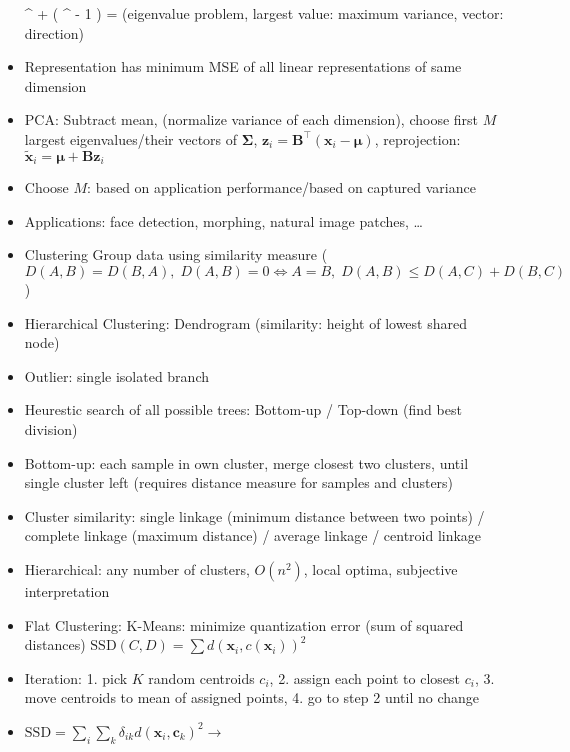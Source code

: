 \documentclass[11pt]{scrartcl}
\begin{document}
\begin{itemize}
        ^\top \bm{\Sigma}  + \lambda ( ^\top {} - 1 ) \Rightarrow 
         = \lambda {} \) (eigenvalue problem, largest value: maximum variance, 
        vector: direction)
    \item Representation has minimum MSE of all linear representations of same dimension
    \item PCA: Subtract mean, (normalize variance of each dimension), choose first \( M \) 
        largest eigenvalues/their vectors of \( \bm{\Sigma} \), \( \bm{z}_i = 
        \bm{B}^\top ( \bm{x}_i - \bm{\mu} ) \), reprojection: \( \tilde{\bm{x}}_i = 
        \bm{\mu} + \bm{B z}_i \)
    \item Choose \( M \): based on application performance/based on captured variance
    \item Applications: face detection, morphing, natural image patches, \dots
    \item Clustering Group data using similarity measure (\(D ( A, B ) = D ( B, A ), \; 
        D ( A, B ) = 0 \Leftrightarrow A = B, \; D ( A, B ) \leq D ( A, C ) + D ( B, C ) \))
    \item Hierarchical Clustering: Dendrogram (similarity: height of lowest shared node)
    \item Outlier: single isolated branch
    \item Heurestic search of all possible trees: Bottom-up / Top-down (find best division)
    \item Bottom-up: each sample in own cluster, merge closest two clusters, until single 
        cluster left (requires distance measure for samples and clusters)
    \item Cluster similarity: single linkage (minimum distance between two points) / complete 
        linkage (maximum distance) / average linkage / centroid linkage
    \item Hierarchical: any number of clusters, \( O ( n^2 ) \), local optima, subjective 
        interpretation
    \item Flat Clustering: K-Means: minimize quantization error (sum of squared distances) 
        \( \mathrm{SSD} ( C, D ) = \sum d ( \bm{x}_i, c ( \bm{x}_i ) )^2 \)
    \item Iteration: 1. pick \( K \) random centroids \( c_i \), 2. assign each point to 
        closest \( c_i \), 3. move centroids to mean of assigned points, 4. go to step 2 until 
        no change
    \item \( \mathrm{SSD} = \sum_i \sum_k \delta_{ik} d ( \bm{x}_i, \bm{c}_k )^2 \rightarrow \) 

\end{itemize}
\end{document}
